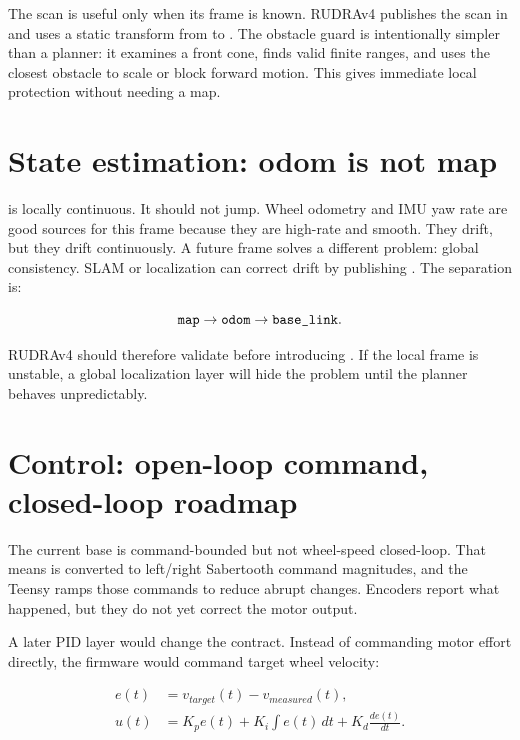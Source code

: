 The scan is useful only when its frame is known. RUDRAv4 publishes the scan in
 and uses a static transform from  to . The
obstacle guard is intentionally simpler than a planner: it examines a front cone,
finds valid finite ranges, and uses the closest obstacle to scale or block forward
motion. This gives immediate local protection without needing a map.

\section{State estimation: odom is not map}

 is locally continuous. It should not jump. Wheel odometry and IMU yaw rate
are good sources for this frame because they are high-rate and smooth. They drift,
but they drift continuously. A future  frame solves a different problem:
global consistency. SLAM or localization can correct drift by publishing
. The separation is:

\begin{equation}
\cmd{map} \rightarrow \cmd{odom} \rightarrow \cmd{base_link}.
\end{equation}

RUDRAv4 should therefore validate  before introducing
. If the local frame is unstable, a global localization layer will
hide the problem until the planner behaves unpredictably.

\section{Control: open-loop command, closed-loop roadmap}

The current base is command-bounded but not wheel-speed closed-loop. That means
 is converted to left/right Sabertooth command magnitudes, and the
Teensy ramps those commands to reduce abrupt changes. Encoders report what happened,
but they do not yet correct the motor output.

A later PID layer would change the contract. Instead of commanding motor effort
directly, the firmware would command target wheel velocity:

\begin{align}
e(t) &= v_{target}(t)-v_{measured}(t),\\
u(t) &= K_p e(t)+K_i\int e(t)\,dt+K_d\frac{de(t)}{dt}.
\end{align}

